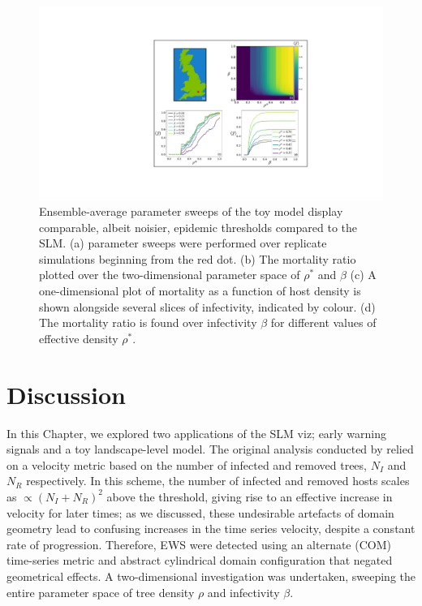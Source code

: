 \begin{figure}
    \centering
    \includegraphics[scale=0.55]{chapter4/figures/figure4-param-sweeps.pdf}
    \caption{ Ensemble-average parameter sweeps of the toy model display comparable, albeit noisier, epidemic thresholds compared to the SLM. (a)   parameter sweeps were performed over replicate simulations beginning from the red dot. (b) The mortality ratio plotted over the two-dimensional parameter space of $\rho^*$ and $\beta$ (c) A one-dimensional plot of mortality as a function of host density is shown alongside several slices of infectivity, indicated by colour. (d) The mortality ratio is found over infectivity $\beta$ for different values of effective density $\rho^{*}$.}
    \label{fig:heterogeneous-phase-space}
\end{figure}

\newpage

\section{Discussion}
\label{sec:ch4-discussion}

In this Chapter, we explored two applications of the SLM viz; early warning signals and a toy landscape-level model.
The original analysis conducted by \cite{OROZCOFUENTES201912} relied on a velocity metric based on the number of 
infected and removed trees, $N_I$ and $N_R$ respectively. In this scheme, the number of infected and removed hosts scales as
$\propto (N_I + N_R)^2$ above the threshold, giving rise to an effective increase in velocity for later times;
as we discussed, these undesirable artefacts of domain geometry lead to confusing increases in the time series velocity, 
despite a constant rate of progression. Therefore, EWS were detected using an alternate (COM) time-series metric and abstract 
cylindrical domain configuration that negated geometrical effects.
A two-dimensional investigation was undertaken, sweeping the entire parameter space of tree density $\rho$ and infectivity $\beta$.

